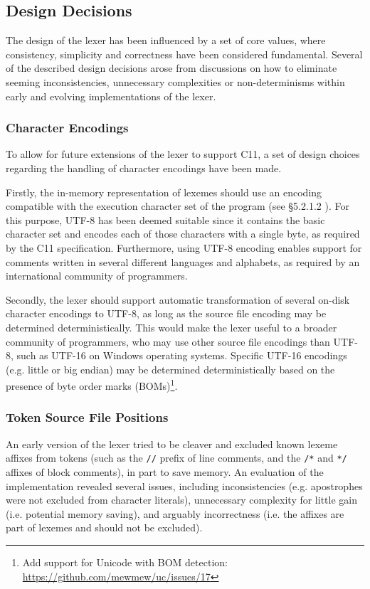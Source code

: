 \subsection{Design Decisions}

The design of the lexer has been influenced by a set of core values, where consistency, simplicity and correctness have been considered fundamental. Several of the described design decisions arose from discussions on how to eliminate seeming inconsistencies, unnecessary complexities or non-determinisms within early and evolving implementations of the lexer.

\subsubsection{Character Encodings}

To allow for future extensions of the lexer to support C11, a set of design choices regarding the handling of character encodings have been made.

Firstly, the in-memory representation of lexemes should use an encoding compatible with the execution character set of the program (see §5.2.1.2 \cite{c11_spec}). For this purpose, UTF-8 has been deemed suitable since it contains the basic character set and encodes each of those characters with a single byte, as required by the C11 specification. Furthermore, using UTF-8 encoding enables support for comments written in several different languages and alphabets, as required by an international community of programmers.

Secondly, the lexer should support automatic transformation of several on-disk character encodings to UTF-8, as long as the source file encoding may be determined deterministically. This would make the lexer useful to a broader community of programmers, who may use other source file encodings than UTF-8, such as UTF-16 on Windows operating systems. Specific UTF-16 encodings (e.g. little or big endian) may be determined deterministically based on the presence of byte order marks (BOMs)\footnote{Add support for Unicode with BOM detection: \url{https://github.com/mewmew/uc/issues/17}}.

\subsubsection{Token Source File Positions}

An early version of the lexer tried to be cleaver and excluded known lexeme affixes from tokens (such as the \texttt{//} prefix of line comments, and the \texttt{/*} and \texttt{*/} affixes of block comments), in part to save memory. An evaluation of the implementation revealed several issues, including inconsistencies (e.g. apostrophes were not excluded from character literals), unnecessary complexity for little gain (i.e. potential memory saving), and arguably incorrectness (i.e. the affixes are part of lexemes and should not be excluded).

